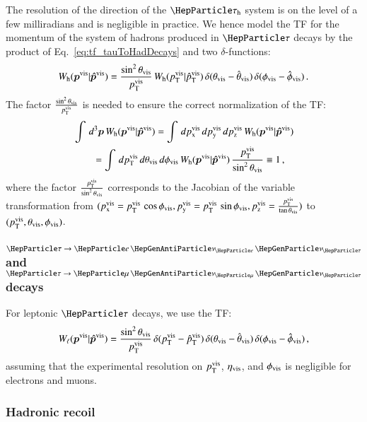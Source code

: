 The resolution of the direction of the $\tauh$ system is on the level
of a few milliradians and is negligible in practice.
We hence model the TF for the momentum of the system of hadrons
produced in $\Pgt$ decays by the product of Eq.~\ref{eq:tf_tauToHadDecays} and two
$\delta$-functions:
\begin{equation}
W_{\textrm{h}}( \bm{p}^{\textrm{vis}} | \bm{\hat{p}}^{\textrm{vis}} ) =
 \frac{\sin^{2}\theta_{\textrm{vis}}}{p_{\textrm{T}}^{\textrm{vis}}} \, 
  W_{\textrm{h}}( p_{\textrm{T}}^{\textrm{vis}} | \hat{p}_{\textrm{T}}^{\textrm{vis}} ) \,
  \delta( \theta_{\textrm{vis}} - \hat{\theta}_{\textrm{vis}} ) \, 
  \delta( \phi_{\textrm{vis}} - \hat{\phi}_{\textrm{vis}} ) \, .
\label{eq:tf_tauToHadDecays}
\end{equation}
The factor $\frac{\sin^{2}\theta_{\textrm{vis}}}{p_{\textrm{T}}^{\textrm{vis}}}$ is needed
to ensure the correct normalization of the TF:
\begin{align}
& \int \, d^{3}\bm{p}  \, W_{\textrm{h}}( \bm{p}^{\textrm{vis}} | \bm{\hat{p}}^{\textrm{vis}} ) = \int \, dp_{\textrm{x}}^{\textrm{vis}} \, dp_{\textrm{y}}^{\textrm{vis}} \, dp_{\textrm{z}}^{\textrm{vis}} \, W_{\textrm{h}}( \bm{p}^{\textrm{vis}} | \bm{\hat{p}}^{\textrm{vis}} ) \nonumber \\
& \qquad = \int \, dp_{\textrm{T}}^{\textrm{vis}} \, d\theta_{\textrm{vis}} \, d\phi_{\textrm{vis}} \, W_{\textrm{h}}( \bm{p}^{\textrm{vis}} | \bm{\hat{p}}^{\textrm{vis}} ) \, 
  \frac{p_{\textrm{T}}^{\textrm{vis}}}{\sin^{2} \theta_{\textrm{vis}}} \equiv 1 \, ,
\end{align}
where the factor $\frac{p_{\textrm{T}}^{\textrm{vis}}}{\sin^{2} \theta_{\textrm{vis}}}$ corresponds to the Jacobian of the variable transformation 
from $(p_{\textrm{x}}^{\textrm{vis}} = p_{\textrm{T}}^{\textrm{vis}} \, \cos\phi_{\textrm{vis}}, p_{\textrm{y}}^{\textrm{vis}} = p_{\textrm{T}}^{\textrm{vis}} \, \sin\phi_{\textrm{vis}}, p_{\textrm{z}}^{\textrm{vis}} = \frac{p_{\textrm{T}}^{\textrm{vis}}}{\tan\theta_{\textrm{vis}}})$ 
to $(p_{\textrm{T}}^{\textrm{vis}}, \theta_{\textrm{vis}}, \phi_{\textrm{vis}})$.

\subsubsection{$\Pgt \to \enunu$ and $\Pgt \to \mununu$ decays}
\label{sec:mem_TF_tauToLepDecays}

For leptonic $\Pgt$ decays,
we use the TF:
\begin{equation}
W_{\ell}( \bm{p}^{\textrm{vis}} | \bm{\hat{p}}^{\textrm{vis}} ) =  
 \frac{\sin^{2} \theta_{\textrm{vis}}}{p_{\textrm{T}}^{\textrm{vis}}} \, 
  \delta( p_{\textrm{T}}^{\textrm{vis}} - \hat{p}_{\textrm{T}}^{\textrm{vis}} ) \, 
  \delta( \theta_{\textrm{vis}} - \hat{\theta}_{\textrm{vis}} ) \, 
  \delta( \phi_{\textrm{vis}} - \hat{\phi}_{\textrm{vis}} ) \, ,
\label{eq:tf_tauToLepDecays}
\end{equation}
assuming that the experimental resolution on $p_{\textrm{T}}^{\textrm{vis}}$,
$\eta_{\textrm{vis}}$, and $\phi_{\textrm{vis}}$ is negligible for electrons and
muons.


\subsubsection{Hadronic recoil}
\label{sec:mem_TF_hadRecoil}

